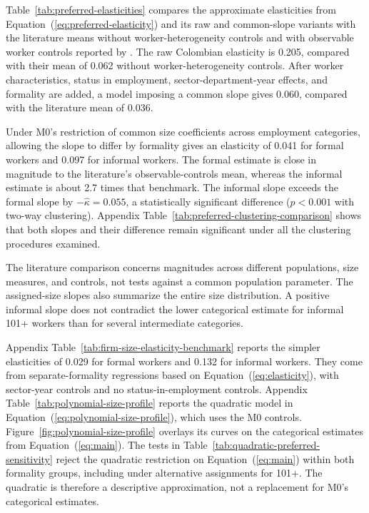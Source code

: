 Table~\ref{tab:preferred-elasticities} compares the approximate elasticities
from Equation~(\ref{eq:preferred-elasticity}) and its raw and common-slope
variants with the literature means without worker-heterogeneity controls and
with observable worker controls reported by \citet{DiegmannMullerSchoefer2026}.
The raw Colombian elasticity is 0.205, compared with their mean of 0.062
without worker-heterogeneity controls. After worker characteristics, status in employment,
sector-department-year effects, and formality are added, a model imposing
a common slope gives 0.060, compared with the literature mean of 0.036.



Under M0's restriction of common size coefficients across employment categories,
allowing the slope to differ by formality gives an elasticity of 0.041 for
formal workers and 0.097 for informal workers. The formal estimate is close
in magnitude to the literature's observable-controls mean, whereas the informal
estimate is about 2.7 times that benchmark. The informal slope exceeds the
formal slope by \(-\widehat{\kappa}=0.055\), a statistically significant difference
(\(p<0.001\) with two-way clustering).
Appendix Table~\ref{tab:preferred-clustering-comparison} shows that both
slopes and their difference remain significant under all the clustering
procedures examined.

The literature comparison concerns magnitudes across different populations,
size measures, and controls, not tests against a common population parameter.
The assigned-size slopes also summarize the entire size distribution.
A positive informal slope does not contradict the lower categorical estimate
for informal 101+ workers than for several intermediate categories.

Appendix Table~\ref{tab:firm-size-elasticity-benchmark} reports the simpler
elasticities of 0.029 for formal workers and 0.132 for informal workers.
They come from separate-formality regressions based on Equation~(\ref{eq:elasticity}),
with sector-year controls and no status-in-employment controls.
Appendix Table~\ref{tab:polynomial-size-profile} reports the quadratic model in
Equation~(\ref{eq:polynomial-size-profile}), which uses the M0 controls.
Figure~\ref{fig:polynomial-size-profile} overlays its curves on the categorical
estimates from Equation~(\ref{eq:main}).
The tests in Table~\ref{tab:quadratic-preferred-sensitivity} reject the quadratic restriction on
Equation~(\ref{eq:main}) within
both formality groups, including under alternative assignments for 101+.
The quadratic is therefore a descriptive approximation, not a replacement
for M0's categorical estimates.

\FloatBarrier

